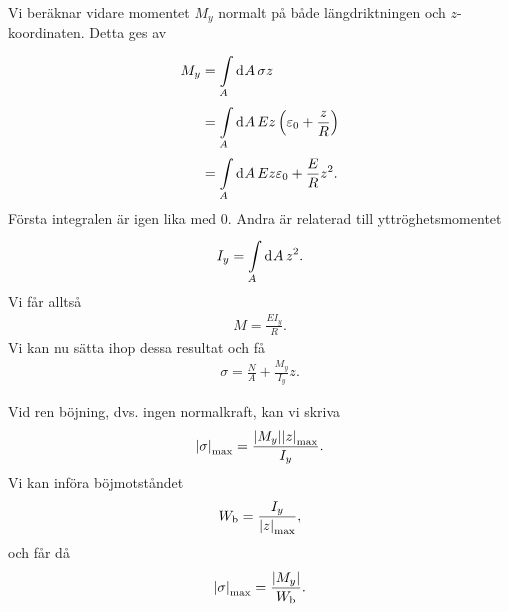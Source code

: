 Vi beräknar vidare momentet $M_{y}$ normalt på både längdriktningen och $z$-koordinaten. Detta ges av
\begin{align*}
	M_{y} &= \int\limits_{A}^{}\dd[]{A}\sigma z \\
	      &= \int\limits_{A}^{}\dd[]{A}Ez\left(\varepsilon_{0} + \frac{z}{R}\right) \\
	      &= \int\limits_{A}^{}\dd[]{A}Ez\varepsilon_{0} + \frac{E}{R}z^{2}.
\end{align*}
Första integralen är igen lika med $0$. Andra är relaterad till yttröghetsmomentet
\begin{align*}
	I_{y} = \int\limits_{A}^{}\dd[]{A}z^{2}.
\end{align*}
Vi får alltså
\begin{align*}
	M = \frac{EI_{y}}{R}.
\end{align*}
Vi kan nu sätta ihop dessa resultat och få
\begin{align*}
	\sigma = \frac{N}{A} + \frac{M_{y}}{I_{y}}z.
\end{align*}

Vid ren böjning, dvs. ingen normalkraft, kan vi skriva
\begin{align*}
	\abs{\sigma}_{\text{max}} = \frac{\abs{M_{y}}\abs{z}_{\text{max}}}{I_{y}}.
\end{align*}
Vi kan införa böjmotståndet
\begin{align*}
	W_{\text{b}} = \frac{I_{y}}{\abs{z}_{\text{max}}},
\end{align*}
och får då
\begin{align*}
	\abs{\sigma}_{\text{max}} = \frac{\abs{M_{y}}}{W_{\text{b}}}.
\end{align*}